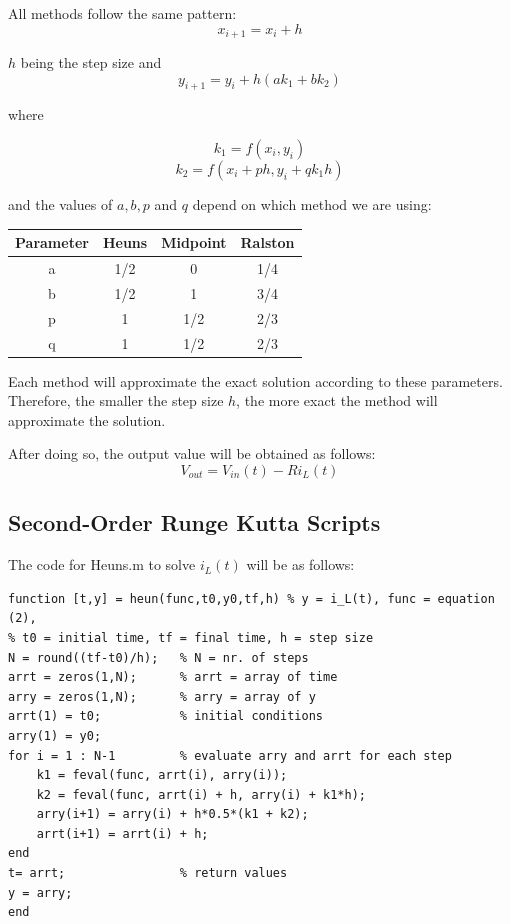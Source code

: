 \documentclass[11pt,a4paper]{article}
\begin{document}
All methods follow the same pattern:
\begin{equation}
x_{i+1} = x_i + h
\end{equation}

$h$ being the step size and
\begin{equation}
   y_{i+1} = y_i + h (a k_1 + b k_2)
\end{equation}

where

\[k_1 = f(x_i, y_i)\]
\[k_2 = f(x_i + p h, y_i + q k_1 h)\]

and the values of $a, b, p$ and $q$ depend on which method we are using:

\begin{center}
 \begin{tabular}{||c | c c c||}
 \hline
 Parameter & Heuns & Midpoint & Ralston \\ [0.5ex]
 \hline\hline
 a & 1/2 & 0 & 1/4 \\
 \hline
 b & 1/2 & 1 & 3/4 \\
 \hline
 p & 1 & 1/2 & 2/3 \\
 \hline
 q & 1 & 1/2 & 2/3 \\ [1ex]
 \hline
\end{tabular}
\end{center}

Each method will approximate the exact solution according to these parameters. Therefore, the smaller the step size $h$, the more exact the method will approximate the solution.

 After doing so, the output value will be obtained as follows:
\begin{equation}
V_{out} = V_{in}(t) - R i_L(t)
\end{equation}

\newpage

\subsection{Second-Order Runge Kutta Scripts}

\vspace{-2mm}The code for Heuns.m to solve $i_L(t)$ will be as follows:

\begin{verbatim}
function [t,y] = heun(func,t0,y0,tf,h) % y = i_L(t), func = equation (2),
% t0 = initial time, tf = final time, h = step size
N = round((tf-t0)/h);   % N = nr. of steps
arrt = zeros(1,N);      % arrt = array of time
arry = zeros(1,N);      % arry = array of y
arrt(1) = t0;           % initial conditions
arry(1) = y0;
for i = 1 : N-1         % evaluate arry and arrt for each step
    k1 = feval(func, arrt(i), arry(i));
    k2 = feval(func, arrt(i) + h, arry(i) + k1*h);
    arry(i+1) = arry(i) + h*0.5*(k1 + k2);
    arrt(i+1) = arrt(i) + h;
end
t= arrt;                % return values
y = arry;
end
\end{verbatim}
\end{document}
